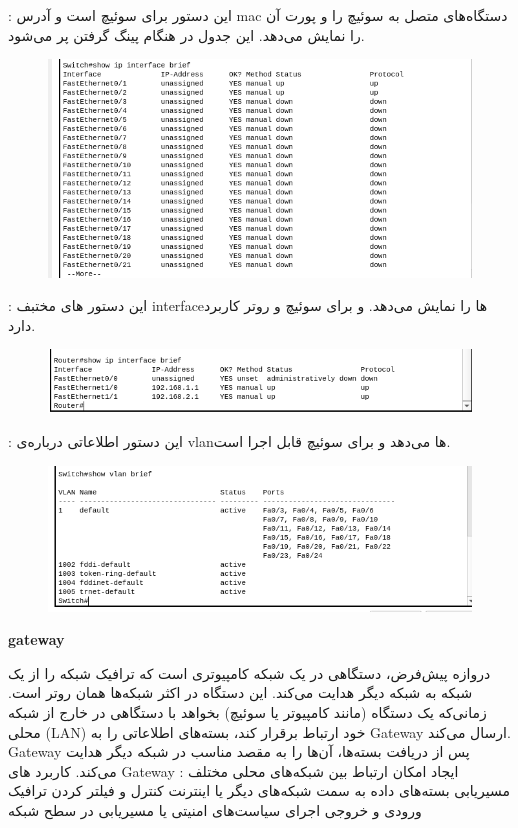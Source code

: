 : این دستور برای سوئیچ است و آدرس mac دستگاه‌های متصل به سوئیچ را و پورت آن را نمایش می‌دهد. این جدول در هنگام پینگ گرفتن پر می‌شود.
\\
\begin{figure}[h]
    \centering
    \includegraphics[width=1\textwidth]{img/q/5.png}
\end{figure}
: این دستور های مختبف interfaceها را نمایش می‌دهد. و برای سوئیچ و روتر کاربرد دارد.
\\
\begin{figure}[h]
    \centering
    \includegraphics[width=1\textwidth]{img/q/6.png}
\end{figure}
: این دستور اطلاعاتی درباره‌ی vlanها می‌دهد و برای سوئیچ قابل اجرا است.
\\
\begin{figure}[h]
    \centering
    \includegraphics[width=1\textwidth]{img/q/7.png}
\end{figure}

\clearpage
\textbf{gateway}

دروازه پیش‌فرض، دستگاهی در یک شبکه کامپیوتری است که ترافیک شبکه را از یک شبکه به شبکه دیگر هدایت می‌کند. این دستگاه در اکثر شبکه‌ها همان روتر است.
زمانی‌که یک دستگاه (مانند کامپیوتر یا سوئیچ) بخواهد با دستگاهی در خارج از شبکه محلی (LAN) خود ارتباط برقرار کند، بسته‌های اطلاعاتی را به Gateway ارسال می‌کند. Gateway پس از دریافت بسته‌ها، آن‌ها را به مقصد مناسب در شبکه دیگر هدایت می‌کند.
 کاربرد های Gateway :
ایجاد امکان ارتباط بین شبکه‌های محلی مختلف
مسیریابی بسته‌های داده به سمت شبکه‌های دیگر یا اینترنت
کنترل و فیلتر کردن ترافیک ورودی و خروجی
اجرای سیاست‌های امنیتی یا مسیریابی در سطح شبکه

